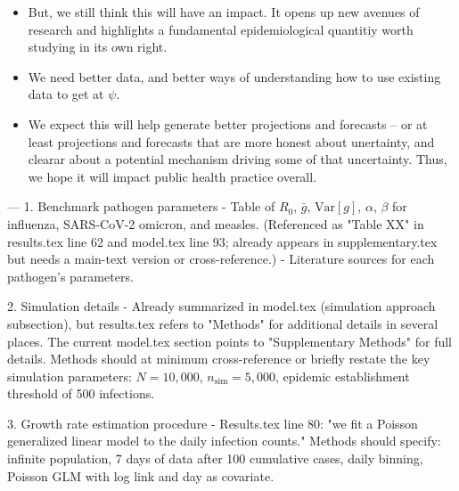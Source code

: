 \begin{itemize}
  \item But, we still think this will have an impact. It opens up new avenues of research and highlights a fundamental epidemiological quantitiy worth studying in its own right. 
  \item We need better data, and better ways of understanding how to use existing data to get at $\psi$. 
  \item We expect this will help generate better projections and forecasts -- or at least projections and forecasts that are more honest about unertainty, and clearar about a potential mechanism driving some of that uncertainty. Thus, we hope it will impact public health practice overall. 
\end{itemize}



























  ---
  1. Benchmark pathogen parameters
  - Table of $R_0$, $\bar{g}$, $\text{Var}[g]$, $\alpha$, $\beta$ for influenza, SARS-CoV-2 omicron,
  and measles. (Referenced as "Table XX" in results.tex line 62 and model.tex line 93; already
  appears in supplementary.tex but needs a main-text version or cross-reference.)
  - Literature sources for each pathogen's parameters.

  2. Simulation details
  - Already summarized in model.tex (simulation approach subsection), but results.tex refers to
  "Methods" for additional details in several places. The current model.tex section points to
  "Supplementary Methods" for full details. Methods should at minimum cross-reference or briefly
  restate the key simulation parameters: $N = 10{,}000$, $n_\text{sim} = 5{,}000$, epidemic
  establishment threshold of 500 infections.

  3. Growth rate estimation procedure
  - Results.tex line 80: "we fit a Poisson generalized linear model to the daily infection counts."
  Methods should specify: infinite population, 7 days of data after 100 cumulative cases, daily
  binning, Poisson GLM with log link and day as covariate.

